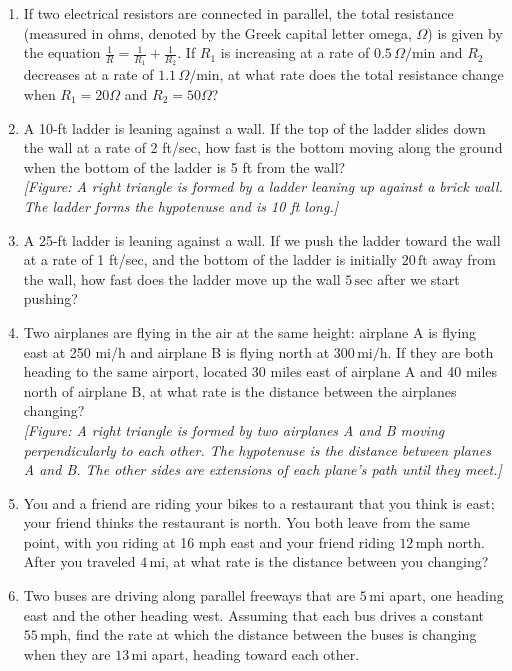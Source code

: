 \documentclass{exercises}
\begin{document}
\begin{enumerate}[resume]
\item \techrequired If two electrical resistors are connected in parallel, the total resistance (measured in ohms, denoted by the Greek capital letter omega, $\Omega$) is given by the equation $\frac{1}{R}=\frac{1}{R_{1}}+\frac{1}{R_{2}}$. If $R_{1}$ is increasing at a rate of $0.5\,\Omega/\text{min}$ and $R_{2}$ decreases at a rate of $1.1\,\Omega/\text{min}$, at what rate does the total resistance change when $R_{1}=20\Omega$ and $R_{2}=50\Omega$?
\item A 10-ft ladder is leaning against a wall. If the top of the ladder slides down the wall at a rate of 2 ft/sec, how fast is the bottom moving along the ground when the bottom of the ladder is 5 ft from the wall? \\ \textit{[Figure: A right triangle is formed by a ladder leaning up against a brick wall. The ladder forms the hypotenuse and is 10 ft long.]}
\item A 25-ft ladder is leaning against a wall. If we push the ladder toward the wall at a rate of 1 ft/sec, and the bottom of the ladder is initially $20\,\text{ft}$ away from the wall, how fast does the ladder move up the wall $5\,\text{sec}$ after we start pushing?
\item Two airplanes are flying in the air at the same height: airplane A is flying east at 250 mi/h and airplane B is flying north at $300\,\text{mi/h}$. If they are both heading to the same airport, located 30 miles east of airplane A and 40 miles north of airplane B, at what rate is the distance between the airplanes changing? \\ \textit{[Figure: A right triangle is formed by two airplanes A and B moving perpendicularly to each other. The hypotenuse is the distance between planes A and B. The other sides are extensions of each plane's path until they meet.]}
\item You and a friend are riding your bikes to a restaurant that you think is east; your friend thinks the restaurant is north. You both leave from the same point, with you riding at 16 mph east and your friend riding $12\,\text{mph}$ north. After you traveled $4\,\text{mi}$, at what rate is the distance between you changing?
\item Two buses are driving along parallel freeways that are $5\,\text{mi}$ apart, one heading east and the other heading west. Assuming that each bus drives a constant $55\,\text{mph}$, find the rate at which the distance between the buses is changing when they are $13\,\text{mi}$ apart, heading toward each other.

\end{enumerate}
\end{document}
